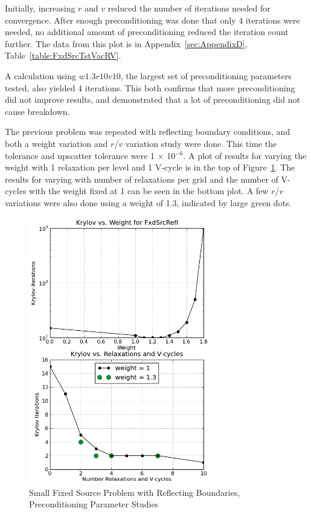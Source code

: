 Initially, increasing $r$ and $v$ reduced the number of iterations needed for convergence. After enough preconditioning was done that only 4 iterations were needed, no additional amount of preconditioning reduced the iteration count further. The data from this plot is in Appendix~\ref{sec:AppendixD}, Table~\ref{table:FxdSrcTstVacRV}. 

A calculation using $w1.3r10v10$, the largest set of preconditioning parameters tested, also yielded 4 iterations. This both confirms that more preconditioning did not improve results, and demonstrated that a lot of preconditioning did not cause breakdown. 

The previous problem was repeated with reflecting boundary conditions, and both a weight variation and $r$/$v$  variation study were done. This time the tolerance and upscatter tolerance were 1 $\times$ 10$^{-6}$. A plot of results for varying the weight with 1 relaxation per level and 1 V-cycle is in the top of Figure~\ref{fig:FxdSrcRefl}. The results for varying with number of relaxations per grid and the number of V-cycles with the weight fixed at 1 can be seen in the bottom plot. A few $r$/$v$ variations were also done using a weight of 1.3, indicated by large green dots.
%
\begin{figure}[!ht]
    \begin{center}
      \includegraphics [width=0.7\textwidth, height=0.8\textheight] {FxdSrcRefl}
   \end{center}
   \caption{Small Fixed Source Problem with Reflecting Boundaries, Preconditioning Parameter Studies}
   \label{fig:FxdSrcRefl}
\end{figure}

